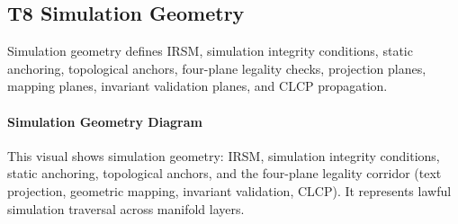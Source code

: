 \begin{center}
\end{center}


\subsection{T8 Simulation Geometry}
Simulation geometry defines IRSM, simulation integrity conditions, static
anchoring, topological anchors, four-plane legality checks, projection planes,
mapping planes, invariant validation planes, and CLCP propagation.

\paragraph{Simulation Geometry Diagram}
This visual shows simulation geometry: IRSM, simulation integrity conditions,
static anchoring, topological anchors, and the four-plane legality corridor
(text projection, geometric mapping, invariant validation, CLCP). It represents
lawful simulation traversal across manifold layers.


